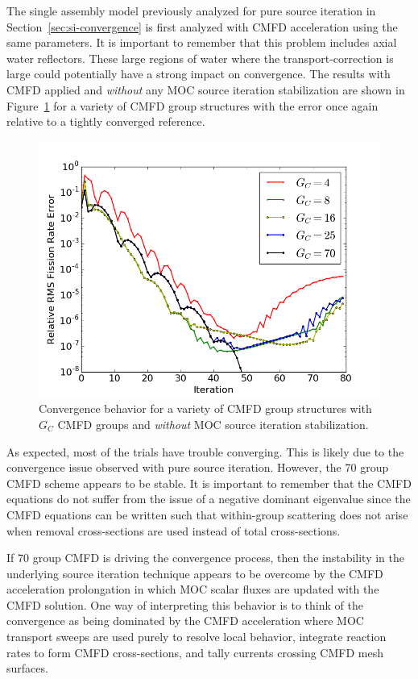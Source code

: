 The single assembly model previously analyzed for pure source iteration in Section~\ref{sec:si-convergence} is first analyzed with \ac{CMFD} acceleration using the same parameters. It is important to remember that this problem includes axial water reflectors. These large regions of water where the transport-correction is large could potentially have a strong impact on convergence. The results with \ac{CMFD} applied and \textit{without} any \ac{MOC} source iteration stabilization are shown in Figure~\ref{fig:sa-cmfd-no-stab} for a variety of \ac{CMFD} group structures with the error once again relative to a tightly converged reference.
\begin{figure}[ht!]
	\centering
	\includegraphics[width=0.65\linewidth]{figures/convergence/sa_no_stab_cmfd.png}
	\caption{Convergence behavior for a variety of \ac{CMFD} group structures with $G_C$ \ac{CMFD} groups and \textit{without} \ac{MOC} source iteration stabilization.}
	\label{fig:sa-cmfd-no-stab}
\end{figure}
As expected, most of the trials have trouble converging. This is likely due to the convergence issue observed with pure source iteration. However, the 70 group \ac{CMFD} scheme appears to be stable. It is important to remember that the \ac{CMFD} equations do not suffer from the issue of a negative dominant eigenvalue since the \ac{CMFD} equations can be written such that within-group scattering does not arise when removal cross-sections are used instead of total cross-sections.

If 70 group \ac{CMFD} is driving the convergence process, then the instability in the underlying source iteration technique appears to be overcome by the \ac{CMFD} acceleration prolongation in which \ac{MOC} scalar fluxes are updated with the \ac{CMFD} solution. One way of interpreting this behavior is to think of the convergence as being dominated by the \ac{CMFD} acceleration where \ac{MOC} transport sweeps are used purely to resolve local behavior, integrate reaction rates to form \ac{CMFD} cross-sections, and tally currents crossing \ac{CMFD} mesh surfaces. 

